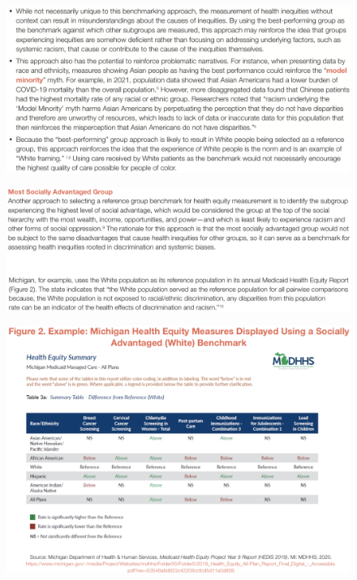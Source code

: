 \documentclass[14pt]{extarticle}
\begin{document}
\begin{figure}[H]
    \centering
    \includegraphics[width=1\textwidth]{fig9.png}
\end{figure}
\begin{figure}[H]
    \centering
    \includegraphics[width=1\textwidth]{fig10.png}
\end{figure}
\begin{figure}[H]
    \centering
    \includegraphics[width=1\textwidth]{fig11.png}
\end{figure}
\end{document}
